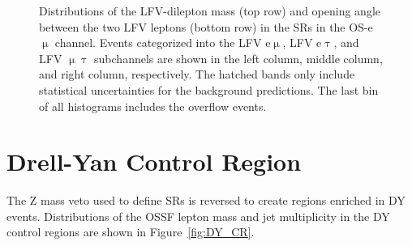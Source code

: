 \begin{figure}[tbh!]
\begin{center}
\begin{tabular}{ccc}
 \end{tabular}
 \caption{Distributions of the LFV-dilepton mass (top row) and opening angle between the two LFV leptons (bottom row) in the \acp{SR} in the \ac{OS}-e$\upmu$ channel. Events categorized into the LFV e$\upmu$, LFV e$\uptau$, and LFV $\upmu\uptau$ subchannels are shown in the left column, middle column, and right column, respectively. The hatched bands only include statistical uncertainties for the background predictions. The last bin of all histograms includes the overflow events.}
 \label{fig:LFVmass}
 \end{center}
 \end{figure}

\section{Drell-Yan Control Region}
\label{sec:DY_CR}

The Z mass veto used to define \acp{SR} is reversed to create regions enriched in \ac{DY} events. Distributions of the \ac{OSSF} lepton mass and jet multiplicity in the \ac{DY} control regions are shown in Figure~\ref{fig:DY_CR}.

